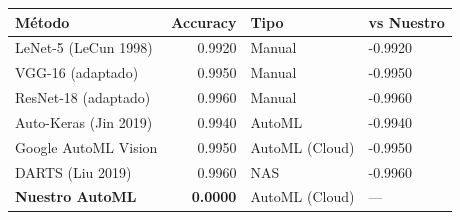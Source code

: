 \begin{tabular}{lrll}
\toprule
Método & Accuracy & Tipo & vs Nuestro \\
\midrule
LeNet-5 (LeCun 1998) & 0.9920 & Manual & -0.9920 \\
VGG-16 (adaptado) & 0.9950 & Manual & -0.9950 \\
ResNet-18 (adaptado) & 0.9960 & Manual & -0.9960 \\
Auto-Keras (Jin 2019) & 0.9940 & AutoML & -0.9940 \\
Google AutoML Vision & 0.9950 & AutoML (Cloud) & -0.9950 \\
DARTS (Liu 2019) & 0.9960 & NAS & -0.9960 \\
\midrule
\textbf{Nuestro AutoML} & \textbf{0.0000} & AutoML (Cloud) & --- \\
\bottomrule
\end{tabular}